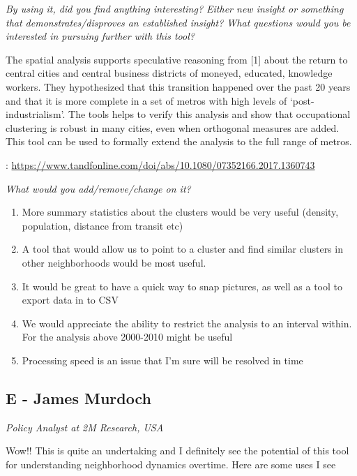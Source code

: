 \documentclass[a4paper]{article}
\newcommand{\question}[1]{\smallskip\noindent\emph{#1}}
\begin{document}
 

\question{By using it, did you find anything interesting? Either new insight or
 something that demonstrates/disproves an established insight? What questions
 would you be interested in pursuing further with this tool? }

 
The spatial analysis  supports speculative reasoning from [1] about the return
to central cities and central business districts of moneyed, educated, knowledge
workers. They hypothesized that this transition happened over the past 20 years
and  that it is more complete in a set of metros with high levels of
‘post-industrialism’. The tools helps to verify this analysis and show that
occupational clustering is robust in many cities, even when orthogonal measures
are added.  This tool can be used to formally extend the analysis to the full
range of metros.


\noindent [1]: \href{https://www.tandfonline.com/doi/abs/10.1080/07352166.2017.1360743}{\url{https://www.tandfonline.com/doi/abs/10.1080/07352166.2017.1360743}}


\question{What would you add/remove/change on it?}
\begin{enumerate}
  \item{More summary statistics about the clusters would be very useful (density,
  population, distance from transit etc)}
  \item{A tool that would allow us to  point to a cluster and find similar clusters in
  other neighborhoods would be most useful.}
  \item{It would be great to have a quick way to snap pictures, as well as a
  tool to export data in to CSV}
  \item{We would appreciate the ability to restrict the analysis to an interval
  within. For the analysis above 2000-2010 might be useful}
  \item{Processing speed is an issue that I'm sure will be resolved in time}
\end{enumerate}



\subsection{E - James Murdoch}
\emph{Policy Analyst at 2M Research, USA}

Wow!! This is quite an undertaking and I definitely see the potential of this
tool for understanding neighborhood dynamics overtime. Here are some uses I see
\end{document}
